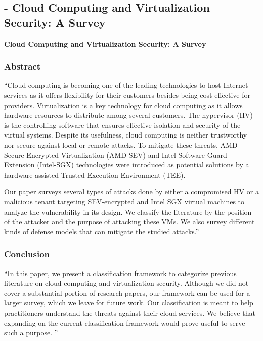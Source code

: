 
\subsection{\cite{maarouf_cloud_2021} - Cloud Computing and Virtualization Security: A Survey}

\textbf{Cloud Computing and Virtualization Security: A Survey }

\subsubsection*{Abstract \cite{maarouf_cloud_2021}}

“Cloud computing is becoming one of the leading technologies to host Internet services as it offers flexibility for their customers besides being cost-effective for providers. Virtualization is a key technology for cloud computing as it allows hardware resources to distribute among several customers. The hypervisor (HV) is the controlling software that ensures effective isolation and security of the virtual systems. Despite its usefulness, cloud computing is neither trustworthy nor secure against local or remote attacks. To mitigate these threats, AMD Secure Encrypted Virtualization (AMD-SEV) and Intel Software Guard Extension (Intel-SGX) technologies were introduced as potential solutions by a hardware-assisted Trusted Execution Environment (TEE).

Our paper surveys several types of attacks done by either a compromised HV or a malicious tenant targeting SEV-encrypted and Intel SGX virtual machines to analyze the vulnerability in its design. We classify the literature by the position of the attacker and the purpose of attacking these VMs. We also survey different kinds of defense models that can mitigate the studied attacks.”

\subsubsection*{Conclusion \cite{maarouf_cloud_2021}}
“In this paper, we present a classification framework to categorize previous literature on cloud computing and virtualization security. Although we did not cover a substantial portion
of research papers, our framework can be used for a larger
survey, which we leave for future work. Our classification
is meant to help practitioners understand the threats against
their cloud services. We believe that expanding on the current
classification framework would prove useful to serve such a
purpose. ”


